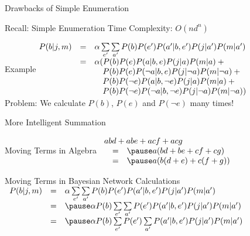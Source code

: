 \documentclass[14pt]{beamer}
\begin{document}
\begin{frame}{Drawbacks of Simple Enumeration}
\begin{block}{Recall: Simple Enumeration}
Time Complexity: $O(nd^{n})$
\end{block}
\pause
\begin{block}{Example}
{\small$\begin{array}{@{}lll@{}}
P(b|j,m) & = & \alpha\sum\limits_{e'}\sum\limits_{a'}P(b)P(e')P(a'|b,e')P(j|a')P(m|a') \\
         & = & \alpha(P(b)P(e)P(a|b,e)P(j|a)P(m|a) + \mbox{}\\
         &   &   \tab P(b)P(e)P(\lnot a|b,e)P(j|\lnot a)P(m|\lnot a) + \mbox{}\\
         &   &   \tab P(b)P(\lnot e)P(a|b,\lnot e)P(j|a)P(m|a) + \mbox{}\\
         &   &   \tab P(b)P(\lnot e)P(\lnot a|b,\lnot e)P(j|\lnot a)P(m|\lnot a))
\end{array}$}
\\
\medskip
\pause Problem: \pause We calculate $P(b)$, $P(e)$ and $P(\lnot e)$ many times!
\end{block}
\end{frame}

\begin{frame}{More Intelligent Summation}
\begin{block}{Moving Terms in Algebra}
$
\begin{array}{lll}
\lefteqn{abd + abe + acf + acg} \\
& = & \pause a(bd + be + cf + cg) \\
& = & \pause a(b(d + e) + c(f + g)) \\
\end{array}
$
\end{block}
\pause
\begin{block}{Moving Terms in Bayesian Network Calculations}
{\small$\begin{array}{lll}
P(b|j,m) & = & \alpha\sum\limits_{e'}\sum\limits_{a'}P(b)P(e')P(a'|b,e')P(j|a')P(m|a') \\
& = & \pause
\alpha P(b)\sum\limits_{e'}\sum\limits_{a'}P(e')P(a'|b,e')P(j|a')P(m|a') \\
& = & \pause
\alpha P(b)\sum\limits_{e'}P(e')\sum\limits_{a'}P(a'|b,e')P(j|a')P(m|a')
\end{array}$}
\end{block}
\end{frame}
\end{document}

